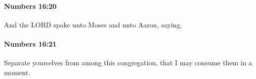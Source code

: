 		\paragraph{Numbers 16:20} %
			\label{NUMBERS-16-20}

			And the LORD spake unto Moses and unto Aaron, saying,


		\paragraph{Numbers 16:21} %
			\label{NUMBERS-16-21}

			Separate yourselves from among this congregation, that I may consume them in a moment.


